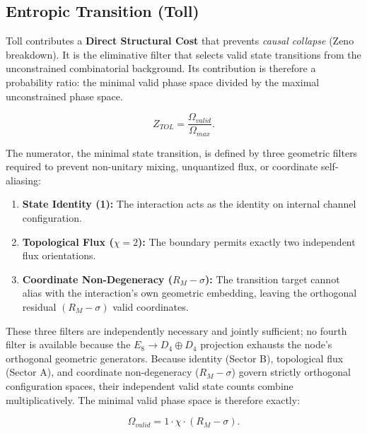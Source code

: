 \subsection{Entropic Transition (Toll)}
\label{subsec:alpha_tol}
Toll contributes a \textbf{Direct Structural Cost} that prevents \emph{causal collapse} (Zeno breakdown). It is the eliminative filter that selects valid state transitions from the unconstrained combinatorial background. Its contribution is therefore a probability ratio: the minimal valid phase space divided by the maximal unconstrained phase space.

\begin{equation}
    Z_{TOL} = \frac{\Omega_{valid}}{\Omega_{max}}.
\end{equation}

The numerator, the minimal state transition, is defined by three geometric filters required to prevent non-unitary mixing, unquantized flux, or coordinate self-aliasing:
\begin{enumerate}
    \item \textbf{State Identity (1):} The interaction acts as the identity on internal channel configuration.
    \item \textbf{Topological Flux ($\chi=2$):} The boundary permits exactly two independent flux orientations.
    \item \textbf{Coordinate Non-Degeneracy ($R_M - \sigma$):} The transition target cannot alias with the interaction's own geometric embedding, leaving the orthogonal residual $(R_M - \sigma)$ valid coordinates.
\end{enumerate}

These three filters are independently necessary and jointly sufficient; no fourth filter is available because the $E_8\to D_4\oplus D_4$ projection exhausts the node's orthogonal geometric generators. Because identity (Sector B), topological flux (Sector A), and coordinate non-degeneracy ($R_M - \sigma$) govern strictly orthogonal configuration spaces, their independent valid state counts combine multiplicatively. The minimal valid phase space is therefore exactly:

\begin{equation}
    \Omega_{valid} = 1 \cdot \chi \cdot (R_M - \sigma).
\end{equation}

